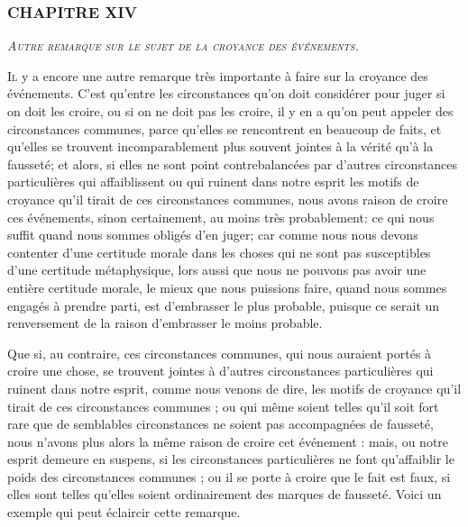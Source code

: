 \subsubsection{\centering \Large CHAPITRE XIV}
\begin{center}\emph{\large\scshape Autre remarque sur le sujet de la croyance des événements.}\end{center}


	\lettrine{I}{l} y a encore une autre remarque très importante à faire sur la croyance des événements. C'est qu'entre les circonstances qu'on doit considérer pour juger si on doit les croire, ou si on ne doit pas les croire, il y en a qu'on peut appeler des circonstances communes, parce qu'elles se rencontrent en beaucoup de faits, et qu'elles se trouvent incomparablement plus souvent jointes à la vérité qu'à la fausseté; et alors, si elles ne sont point contrebalancées par d'autres circonstances particulières qui affaiblissent ou qui ruinent dans notre esprit les motifs de croyance qu'il tirait de ces circonstances communes, nous avons raison de croire ces événements, sinon certainement, au moins très probablement: ce qui nous suffit quand nous sommes obligés d'en juger; car comme nous nous devons contenter d'une certitude morale dans les choses qui ne sont pas susceptibles d'une certitude métaphysique, lors aussi que nous ne pouvons pas avoir une entière certitude morale, le mieux que nous puissions faire, quand nous sommes engagés à prendre parti, est d'embrasser le plus probable, puisque ce serait un renversement de la raison d'embrasser le moins probable.

Que si, au contraire, ces circonstances communes, qui nous auraient portés à croire une chose, se trouvent jointes à d'autres circonstances particulières qui ruinent dans notre esprit, comme nous venons de dire, les motifs de croyance qu'il tirait de ces circonstances communes ; ou qui même soient telles qu'il soit fort rare que de semblables circonstances ne soient pas accompagnées de fausseté, nous n'avons plus alors la même raison de croire cet événement : mais, ou notre esprit demeure en suspens, si les circonstances particulières ne font qu'affaiblir le poids des circonstances communes ; ou il se porte à croire que le fait est faux, si elles sont telles qu'elles soient ordinairement des marques de fausseté. Voici un exemple qui peut éclaircir cette remarque.

